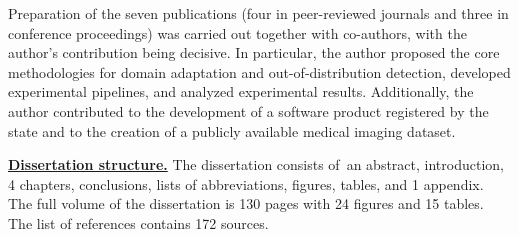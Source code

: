 Preparation of the seven publications (four in peer-reviewed journals and three in conference proceedings) was carried out together with co-authors, with the author’s contribution being decisive. In particular, the author proposed the core methodologies for domain adaptation and out-of-distribution detection, developed experimental pipelines, and analyzed experimental results. Additionally, the author contributed to the development of a software product registered by the state and to the creation of a publicly available medical imaging dataset.

\underline{\textbf{Dissertation structure.}}
The dissertation consists of~an abstract, introduction, 4 chapters, conclusions, lists of abbreviations, figures, tables, and 1 appendix. The full volume of the dissertation is 130 pages with 24 figures and 15 tables. The list of references contains 172 sources.


